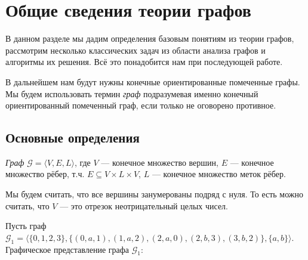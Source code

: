 \section{Общие сведения теории графов}

В данном разделе мы дадим определения базовым понятиям из теории графов, рассмотрим несколько классических задач из области анализа графов и алгоритмы их решения.
Всё это понадобится нам при последующей работе.

В дальнейшем нам будут нужны конечные ориентированные помеченные графы.
Мы будем использовать термин \textit{граф} подразумевая именно конечный ориентированный помеченный граф, если только не оговорено противное.

\subsection{Основные определения}

\begin{definition}
  \textit{Граф} $\mathcal{G} = \langle V, E, L \rangle$, где $V$ --- конечное множество вершин, $E$ --- конечное множество рёбер, т.ч. $E \subseteq V \times L \times V$, $L$ --- конечное множество меток рёбер. 
\end{definition}

Мы будем считать, что все вершины занумерованы подряд с нуля.
То есть можно считать, что $V$ --- это отрезок неотрицательный целых чисел.

\begin{example}
  Пусть граф \\ $\mathcal{G}_1 = \langle \{0,1,2,3\}, \{(0,a,1), (1,a,2), (2,a,0), (2,b,3), (3,b,2)\}, \{a,b\} \rangle$.
  Графическое представление графа $\mathcal{G}_1$:
  \begin{center}
  \end{center}
\end{example}

